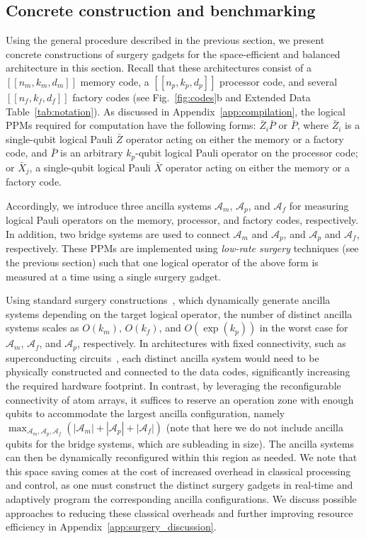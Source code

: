 \documentclass[reprint,twocolumn,secnumarabic,amssymb, aps, prx]{revtex4-2}
\newcommand{\nproc}{n_p}
\newcommand{\kproc}{k_p}
\newcommand{\dproc}{d_p}
\newcommand{\Aproc}{\mathcal{A}_p}
\newcommand{\nm}{n_m}
\newcommand{\km}{k_m}
\newcommand{\dm}{d_m}
\newcommand{\Am}{\mathcal{A}_m}
\newcommand{\nf}{n_f}
\newcommand{\kf}{k_f}
\newcommand{\df}{d_f}
\newcommand{\Af}{\mathcal{A}_f}
\begin{document}
\subsection{Concrete construction and benchmarking \label{app:surgery_concrete}}
Using the general procedure described in the previous section, we present concrete constructions of surgery gadgets for the space-efficient and balanced architecture in this section. Recall that these architectures consist of a $[[\nm, \km, \dm]]$ memory code, a $[[\nproc, \kproc, \dproc]]$ processor code, and several $[[\nf, \kf, \df]]$ factory codes (see Fig.~\ref{fig:codes}b and Extended Data Table~\ref{tab:notation}). As discussed in Appendix~\ref{app:compilation}, the logical PPMs required for computation have the following forms: $\bar{Z}_i \bar{P}$ or $\bar{P}$, where $\bar{Z}_i$ is a single-qubit logical Pauli $\bar{Z}$ operator acting on either the memory or a factory code, and $\bar{P}$ is an arbitrary $\kproc$-qubit logical Pauli operator on the processor code; or $\bar{X}_j$, a single-qubit logical Pauli $\bar{X}$ operator acting on either the memory or a factory code.

Accordingly, we introduce three ancilla systems $\Am$, $\Aproc$, and $\Af$ for measuring logical Pauli operators on the memory, processor, and factory codes, respectively. In addition, two bridge systems are used to connect $\Am$ and $\Aproc$, and $\Aproc$ and $\Af$, respectively. These PPMs are implemented using \emph{low-rate surgery} techniques (see the previous section) such that one logical operator of the above form is measured at a time using a single surgery gadget.

Using standard surgery constructions~\cite{cross2024improved, williamson2024low, zheng2025high}, which dynamically generate ancilla systems depending on the target logical operator, the number of distinct ancilla systems scales as $O(k_m)$, $O(k_f)$, and $O(\exp(k_p))$ in the worst case for $\Am$, $\Af$, and $\Aproc$, respectively. In architectures with fixed connectivity, such as superconducting circuits~\cite{yoder2025tour}, each distinct ancilla system would need to be physically constructed and connected to the data codes, significantly increasing the required hardware footprint. In contrast, by leveraging the reconfigurable connectivity of atom arrays, it suffices to reserve an operation zone with enough qubits to accommodate the largest ancilla configuration, namely $\max_{\Am,\Aproc,\Af} \left(|\Am| + |\Aproc| + |\Af|\right)$ (note that here we do not include ancilla qubits for the bridge systems, which are subleading in size). The ancilla systems can then be dynamically reconfigured within this region as needed. We note that this space saving comes at the cost of increased overhead in classical processing and control, as one must construct the distinct surgery gadgets in real-time and adaptively program the corresponding ancilla configurations. We discuss possible approaches to reducing these classical overheads and further improving resource efficiency in Appendix~\ref{app:surgery_discussion}.
\end{document}
